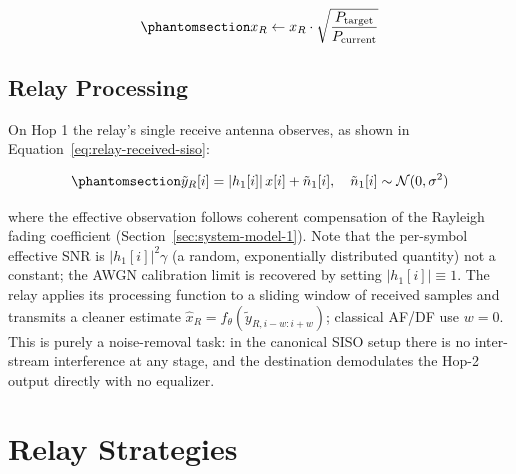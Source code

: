 \begin{equation}\protect\phantomsection\label{eq:power-normalization}{x_R \leftarrow x_R \cdot \sqrt{\frac{P_{\text{target}}}{P_{\text{current}}}}
}\end{equation}

\subsection{Relay Processing}\label{sec:relay-processing-methods}

On Hop 1 the relay's single receive antenna observes, as shown in Equation~\ref{eq:relay-received-siso}:

\begin{equation}\protect\phantomsection\label{eq:relay-received-siso}{\tilde{y}_R[i] = |h_1[i]|\,x[i] + \tilde{n}_1[i], \quad \tilde{n}_1[i] \sim \mathcal{N}(0, \sigma^2)
}\end{equation}

where the effective observation follows coherent compensation of the Rayleigh fading coefficient (Section~\ref{sec:system-model-1}). Note that the per-symbol effective SNR is \(|h_1[i]|^2\gamma\) (a random, exponentially distributed quantity) not a constant; the AWGN calibration limit is recovered by setting \(|h_1[i]| \equiv 1\). The relay applies its processing function to a sliding window of received samples and transmits a cleaner estimate \(\hat{x}_R = f_\theta(\tilde{y}_{R,i-w:i+w})\); classical AF/DF use \(w=0\). This is purely a noise-removal task: in the canonical SISO setup there is no inter-stream interference at any stage, and the destination demodulates the Hop-2 output directly with no equalizer.


\section{Relay Strategies}\label{sec:relay-strategies}

